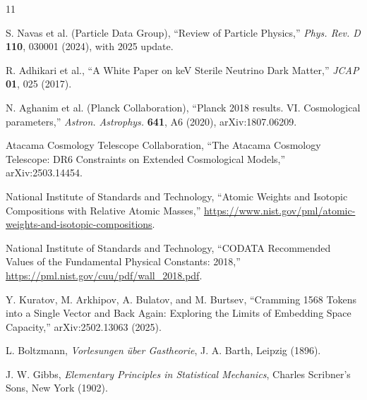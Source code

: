 \documentclass[11pt]{article}
\begin{document}
\begin{thebibliography}{11}

S. Navas et al. (Particle Data Group),
``Review of Particle Physics,''
\emph{Phys. Rev. D} \textbf{110}, 030001 (2024), with 2025 update.

R. Adhikari et al.,
``A White Paper on keV Sterile Neutrino Dark Matter,''
\emph{JCAP} \textbf{01}, 025 (2017).

N. Aghanim et al. (Planck Collaboration),
``Planck 2018 results. VI. Cosmological parameters,''
\emph{Astron. Astrophys.} \textbf{641}, A6 (2020),
arXiv:1807.06209.

Atacama Cosmology Telescope Collaboration,
``The Atacama Cosmology Telescope: DR6 Constraints on Extended Cosmological
Models,''
arXiv:2503.14454.

National Institute of Standards and Technology,
``Atomic Weights and Isotopic Compositions with Relative Atomic Masses,''
\url{https://www.nist.gov/pml/atomic-weights-and-isotopic-compositions}.

National Institute of Standards and Technology,
``CODATA Recommended Values of the Fundamental Physical Constants: 2018,''
\url{https://pml.nist.gov/cuu/pdf/wall_2018.pdf}.

Y. Kuratov, M. Arkhipov, A. Bulatov, and M. Burtsev,
``Cramming 1568 Tokens into a Single Vector and Back Again: Exploring the
Limits of Embedding Space Capacity,''
arXiv:2502.13063 (2025).

L. Boltzmann,
\emph{Vorlesungen \"uber Gastheorie},
J. A. Barth, Leipzig (1896).

J. W. Gibbs,
\emph{Elementary Principles in Statistical Mechanics},
Charles Scribner's Sons, New York (1902).

\end{thebibliography}
\end{document}
